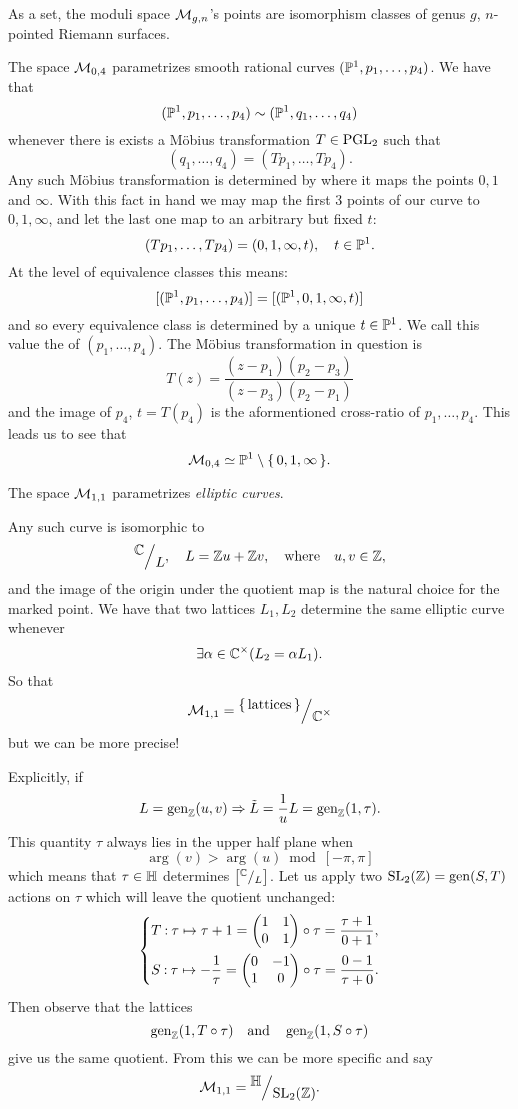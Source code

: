 \documentclass[12pt]{memoir}
\begin{document}
As a set, the moduli space $\mathcal{M}_{g,n}$'s points are isomorphism classes of genus $g$, $n$-pointed Riemann surfaces. 

\begin{Ex}
    The space $\mathcal{M}_{0,4}$ parametrizes smooth rational curves $(\mathbb{P}^1,p_1,\dots,p_4)$. We have that 
    $$(\mathbb{P}^1,p_1,\dots,p_4)\sim(\mathbb{P}^1,q_1,\dots,q_4)$$
    whenever there is exists a Möbius transformation $T\in\operatorname{PGL}_2$ such that 
    $$(q_1,\dots,q_4)=(Tp_1,\dots,Tp_4).$$
    Any such Möbius transformation is determined by where it maps the points $0,1$ and $\infty$. With this fact in hand we may map the first $3$ points of our curve to $0,1,\infty$, and let the last one map to an arbitrary but fixed $t$:
    $$(Tp_1,\dots,Tp_4)=(0,1,\infty,t),\quad t\in\mathbb{P}^1.$$
    At the level of equivalence classes this means:
    $$[(\mathbb{P}^1,p_1,\dots,p_4)]=[(\mathbb{P}^1,0,1,\infty,t)]$$
    and so every equivalence class is determined by a unique $t\in\mathbb{P}^1$. We call this value the  of $(p_1,\dots,p_4)$. The Möbius transformation in question is
    $$T(z)=\frac{(z-p_1)(p_2-p_3)}{(z-p_3)(p_2-p_1)}$$
    and the image of $p_4$, $t=T(p_4)$ is the aformentioned cross-ratio of $p_1,\dots,p_4$. This leads us to see that 
    $$\mathcal{M}_{0,4}\simeq\mathbb{P}^1\setminus\{\,0,1,\infty\,\}.$$
\end{Ex}

\begin{Ex}
    The space $\mathcal{M}_{1,1}$ parametrizes \emph{elliptic curves}.\par
    Any such curve is isomorphic to 
    $$\quot{\bC}{L},\quad L=\bZ u+\bZ v,\word{where}u,v\in\bZ,$$
    and the image of the origin under the quotient map is the natural choice for the marked point. We have that two lattices $L_1,L_2$ determine the same elliptic curve whenever 
    $$\exists \alpha\in\mathbb{C}^\times(L_2=\alpha L_1).$$
    So that 
    $$\cM_{1,1}=\quot{\set{\text{lattices}}}{\bC^\x}$$
    but we can be more precise!\par
    Explicitly, if 
    $$L=\operatorname{gen}_{\mathbb{Z}}(u,v)\Rightarrow \tilde{L}=\frac{1}{u}L=\operatorname{gen}_{\mathbb{Z}}(1,\tau).$$
    This quantity $\tau$ always lies in the upper half plane when 
    $$\arg(v)>\arg(u)\bmod[-\pi,\pi]$$
    which means that $\tau\in\mathbb{H}$ determines $\bonj{\quot{\bC}{L}}$. 
    Let us apply two $\mathrm{SL}_2(\mathbb{Z})=\operatorname{gen}(S,T)$ actions on $\tau$ which will leave the quotient unchanged:
    $$
    \left\lbrace
    \begin{aligned}
        &T\mathbin{:}\tau\mapsto\tau+1=\begin{pmatrix} 1 & 1 \\ 0 & 1 \end{pmatrix}\circ\tau=\frac{\tau+1}{0+1},\\
        &S\mathbin{:}\tau\mapsto-\frac1\tau=\begin{pmatrix} 0 & -1 \\ 1 & 0 \end{pmatrix}\circ\tau=\frac{0-1}{\tau+0}.
    \end{aligned}
    \right.
    $$
    Then observe that the lattices
    $$\operatorname{gen}_{\mathbb{Z}}(1,T\circ\tau)\quad\text{and}\quad\operatorname{gen}_{\mathbb{Z}}(1,S\circ\tau)$$
    give us the same quotient. From this we can be more specific and say 
    $$\cM_{1,1}=\quot{\bH}{\rSL_2(\bZ)}.$$
\end{Ex}
\end{document}
